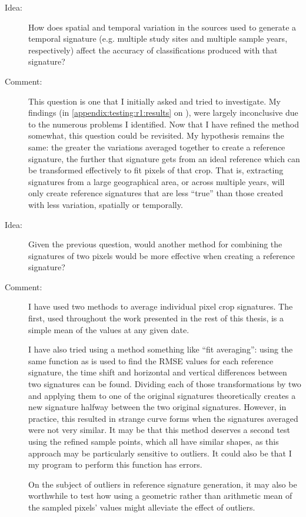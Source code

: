 \begin{description}
\item[Idea:] How does spatial and temporal variation in the sources used to generate a temporal signature (e.g. multiple study sites and multiple sample years, respectively) affect the accuracy of classifications produced with that signature?

\item[Comment:] This question is one that I initially asked and tried to investigate. My findings (in \autoref{appendix:testing:r1:results} on ), were largely inconclusive due to the numerous problems I identified. Now that I have refined the method somewhat, this question could be revisited. My hypothesis remains the same: the greater the variations averaged together to create a reference signature, the further that signature gets from an ideal reference which can be transformed effectively to fit pixels of that crop. That is, extracting signatures from a large geographical area, or across multiple years, will only create reference signatures that are less ``true'' than those created with less variation, spatially or temporally.

\item[Idea:] Given the previous question, would another method for combining the signatures of two pixels would be more effective when creating a reference signature?

\item[Comment:] I have used two methods to average individual pixel crop signatures. The first, used throughout the work presented in the rest of this thesis, is a simple mean of the values at any given date.

I have also tried using a method something like ``fit averaging'': using the same function as is used to find the RMSE values for each reference signature, the time shift and horizontal and vertical differences between two signatures can be found. Dividing each of those transformations by two and applying them to one of the original signatures theoretically creates a new signature halfway between the two original signatures. However, in practice, this resulted in strange curve forms when the signatures averaged were not very similar. It may be that this method deserves a second test using the refined sample points, which all have similar shapes, as this approach may be particularly sensitive to outliers. It could also be that I my program to perform this function has errors.

On the subject of outliers in reference signature generation, it may also be worthwhile to test how using a geometric rather than arithmetic mean of the sampled pixels’ values might alleviate the effect of outliers.
\end{description}

